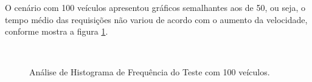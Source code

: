\documentclass[
	12pt,				%
	oneside,			%
	a4paper,			%
	english,			%
	brazil				%
	]{abntex2ppgsi}
\begin{document}
O cenário com 100 veículos apresentou gráficos semalhantes aos de 50, ou seja, o tempo médio das requisições não variou de acordo com o aumento da velocidade, conforme mostra a figura \ref{fig:imgHistFreq100}.

\begin{figure}[ht]
	\caption{Análise de Histograma de Frequência do Teste  com 100 veículos.}
	\centering
	\label{fig:imgHistFreq100}
	\\
\end{figure}
\end{document}
